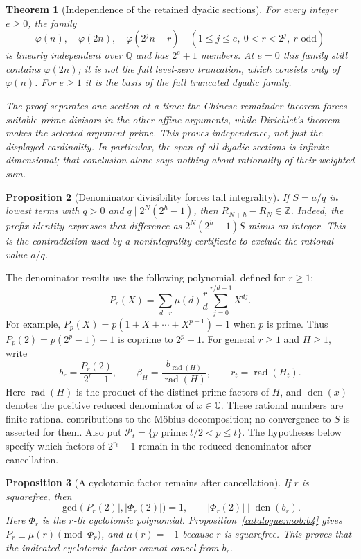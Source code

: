 \documentclass[11pt]{article}
\theoremstyle{plain}
\newtheorem{thm}{Theorem}[section]
\newtheorem{prop}[thm]{Proposition}
\theoremstyle{definition}
\theoremstyle{remark}
\begin{document}
\begin{thm}[Independence of the retained dyadic sections]\label{catalogue:cert:d4}
For every integer $e\ge0$, the family
\[
 \varphi(n),\quad\varphi(2n),\quad
 \varphi(2^jn+r)\quad(1\le j\le e,\ 0<r<2^j,\ r\text{ odd})
\]
is linearly independent over $\mathbb Q$ and has $2^e+1$ members.
At $e=0$ this family still contains $\varphi(2n)$; it is not the full
level-zero truncation, which consists only of $\varphi(n)$. For $e\ge1$
it is the basis of the full truncated dyadic family.

The proof separates one section at a time: the Chinese remainder theorem
forces suitable prime divisors in the other affine arguments, while
Dirichlet's theorem makes the selected argument prime. This proves
independence, not just the displayed cardinality. In particular, the
span of all dyadic sections is infinite-dimensional; that conclusion
alone says nothing about rationality of their weighted sum.
\end{thm}

\begin{prop}[Denominator divisibility forces tail integrality]\label{catalogue:cert:a8}
If $S=a/q$ in lowest terms with $q>0$ and
$q\mid2^N(2^h-1)$, then $R_{N+h}-R_N\in\mathbb Z$.
Indeed, the prefix identity expresses that difference as
$2^N(2^h-1)S$ minus an integer. This is the contradiction used by a
nonintegrality certificate to exclude the rational value $a/q$.
\end{prop}

The denominator results use the following polynomial, defined for $r\ge1$:
\[
 P_r(X)=\sum_{d\mid r}\mu(d)\frac rd
                 \sum_{j=0}^{r/d-1}X^{dj}.
\]
For example, $P_p(X)=p(1+X+\cdots+X^{p-1})-1$ when $p$ is prime.
Thus $P_p(2)=p(2^p-1)-1$ is coprime to $2^p-1$.
For general $r\ge1$ and $H\ge1$, write
\[
 b_r=\frac{P_r(2)}{2^r-1},\qquad
 \beta_H=\frac{b_{\operatorname{rad}(H)}}{\operatorname{rad}(H)},
 \qquad r_t=\operatorname{rad}(H_t).
\]
Here $\operatorname{rad}(H)$ is the product of the distinct prime
factors of $H$, and $\operatorname{den}(x)$ denotes the positive
reduced denominator of $x\in\mathbb Q$. These rational numbers are
finite rational contributions to the M\"obius decomposition; no convergence
to $S$ is asserted for them.
Also put
$\mathcal P_t=\{p\text{ prime}:t/2<p\le t\}$.
The hypotheses below specify which factors of $2^{r_t}-1$ remain in
the reduced denominator after cancellation.

\begin{prop}[A cyclotomic factor remains after cancellation]\label{catalogue:mob:b5}
If $r$ is squarefree, then
\[
 \gcd\bigl(|P_r(2)|,|\Phi_r(2)|\bigr)=1,
 \qquad |\Phi_r(2)|\mid\operatorname{den}(b_r).
\]
Here $\Phi_r$ is the $r$-th cyclotomic polynomial. Proposition~\ref{catalogue:mob:b4}
gives $P_r\equiv\mu(r)\pmod{\Phi_r}$, and $\mu(r)=\pm1$ because
$r$ is squarefree. This proves that the indicated cyclotomic factor
cannot cancel from $b_r$.
\end{prop}
\end{document}
